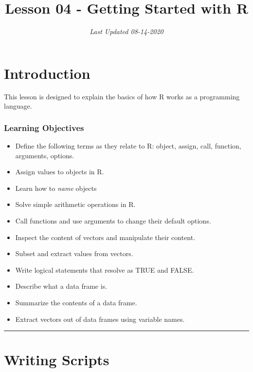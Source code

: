 \documentclass[
]{article}
\title{Lesson 04 - Getting Started with R}
\author{}
\date{\vspace{-2.5em}\emph{Last Updated 08-14-2020}}
\providecommand{\tightlist}{%
  \setlength{\itemsep}{0pt}\setlength{\parskip}{0pt}}
\begin{document}
\maketitle

\hypertarget{introduction}{%
\section{Introduction}\label{introduction}}

This lesson is designed to explain the basics of how R works as a
programming language.

\hypertarget{learning-objectives}{%
\subsubsection{Learning Objectives}\label{learning-objectives}}

\begin{itemize}
\tightlist
\item
  Define the following terms as they relate to R: object, assign, call,
  function, arguments, options.
\item
  Assign values to objects in R.
\item
  Learn how to \emph{name} objects
\item
  Solve simple arithmetic operations in R.
\item
  Call functions and use arguments to change their default options.
\item
  Inspect the content of vectors and manipulate their content.
\item
  Subset and extract values from vectors.
\item
  Write logical statements that resolve as TRUE and FALSE.
\item
  Describe what a data frame is.
\item
  Summarize the contents of a data frame.
\item
  Extract vectors out of data frames using variable names.
\end{itemize}

\begin{center}\rule{0.5\linewidth}{0.5pt}\end{center}

\hypertarget{writing-scripts}{%
\section{Writing Scripts}\label{writing-scripts}}
\end{document}
